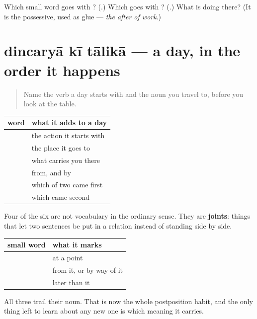 \begin{tcolorbox}[breakable,colback=teal!4,colframe=teal!35!black,title={Before you move on}]
Which small word goes with \textbf{}? (\textbf{}.) Which goes with \textbf{}? (\textbf{}.) What is \textbf{} doing there? (It is the possessive, used as glue — \emph{the after of work}.)
\end{tcolorbox}
\section[\texorpdfstring{\hi{दिनचर्या} \hi{की} \hi{तालिका} (dincaryā kī tālikā)}{दिनचर्या की तालिका (dincaryā kī tālikā)}]{dincaryā kī tālikā — a day, in the order it happens}

\label{lesson:HI-C90-repaso-dincharya}



\begin{quote}
Name the verb a day starts with and the noun you travel to, before you look at the table.
\end{quote}

\begin{grammarlens}[title={Grammar Lens: the six}]
\noindent
\begin{tabularx}{\linewidth}{@{}>{\raggedright\arraybackslash}X>{\raggedright\arraybackslash}X@{}}
\toprule
\textbf{word} & \textbf{what it adds to a day} \\
\midrule
\hi{उठना} & the action it starts with \\
\hi{काम} & the place it goes to \\
\hi{बस} & what carries you there \\
\hi{से} & from, and by \\
\hi{पहले} & which of two came first \\
\hi{के} \hi{बाद} & which came second \\
\bottomrule
\end{tabularx}

Four of the six are not vocabulary in the ordinary sense. They are \textbf{joints}: things that let two sentences be put in a relation instead of standing side by side.
\end{grammarlens}

\begin{grammarlens}[title={Grammar Lens: the three small words, side by side}]
\noindent
\begin{tabularx}{\linewidth}{@{}>{\raggedright\arraybackslash}X>{\raggedright\arraybackslash}X@{}}
\toprule
\textbf{small word} & \textbf{what it marks} \\
\midrule
\hi{पर} & at a point \\
\hi{से} & from it, or by way of it \\
\hi{के} \hi{बाद} & later than it \\
\bottomrule
\end{tabularx}

All three trail their noun. That is now the whole postposition habit, and the only thing left to learn about any new one is which meaning it carries.
\end{grammarlens}

